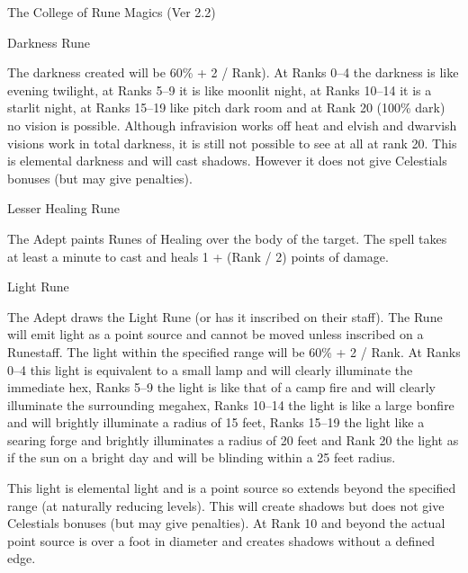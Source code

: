 \begin{Chapter}{The College of Rune Magics (Ver 2.2)}
\begin{spell}[G-2]{Darkness Rune}
\begin{effects}
The darkness created will be 60\% + 2 / Rank). At Ranks 0--4 the
darkness is like evening twilight, at Ranks 5--9 it is like moonlit
night, at Ranks 10--14 it is a starlit night, at Ranks 15--19 like
pitch dark room and at Rank 20 (100\% dark) no vision is possible.
Although infravision works off heat and elvish and dwarvish visions
work in total darkness, it is still not possible to see at all at rank
20. This is elemental darkness and will cast shadows.  However it does
not give Celestials bonuses (but may give penalties).
\end{effects}
\end{spell}

\begin{spell}[G-3]{Lesser Healing Rune}

\begin{effects}
The Adept paints Runes of Healing over the body of the target.  The
spell takes at least a minute to cast and heals 1 + (Rank / 2) points
of damage.
\end{effects}
\end{spell}

\begin{spell}[G-4]{Light Rune}

\begin{effects}
The Adept draws the Light Rune (or has it inscribed on their staff).
The Rune will emit light as a point source and cannot be moved unless
inscribed on a Runestaff.  The light within the specified range will
be 60\% + 2 / Rank. At Ranks 0--4 this light is equivalent to a small
lamp and will clearly illuminate the immediate hex, Ranks 5--9 the
light is like that of a camp fire and will clearly illuminate the
surrounding megahex, Ranks 10--14 the light is like a large bonfire
and will brightly illuminate a radius of 15 feet, Ranks 15--19 the
light like a searing forge and brightly illuminates a radius of 20
feet and Rank 20 the light as if the sun on a bright day and will be
blinding within a 25 feet radius.

This light is elemental light and is a point source so extends beyond
the specified range (at naturally reducing levels). This will create
shadows but does not give Celestials bonuses (but may give penalties).
At Rank 10 and beyond the actual point source is over a foot in
diameter and creates shadows without a defined edge.
\end{effects}
\end{spell}


\end{Chapter}
